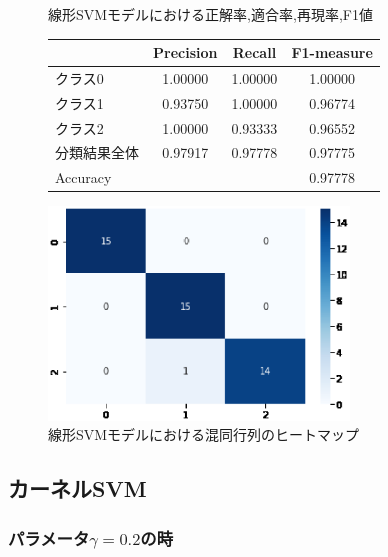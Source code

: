 \documentclass{jarticle}     %
\makeatletter
\newcommand{\tblcaption}[1]{\def\@captype{table}\caption{#1}}
\makeatother
\begin{document}
\begin{figure}[H]
  \def\@captype{table}
  \begin{minipage}[c]{.48\textwidth}
    \tblcaption{線形SVMモデルにおける正解率,適合率,再現率,F1値}
    \label{table:線形SVM}
    \centering
      \begin{tabular}{lccc}
        \hline
        & Precision  &  Recall &  F1-measure \\
        \hline
        クラス0  & 1.00000  & 1.00000 & 1.00000 \\
        クラス1  & 0.93750  & 1.00000 & 0.96774 \\
        クラス2  & 1.00000  & 0.93333 & 0.96552 \\
        分類結果全体  &  0.97917  &  0.97778 & 0.97775 \\
        \hline
        Accuracy & & & 0.97778\\
        \hline
      \end{tabular}
  \end{minipage}
  \hfill
  \begin{minipage}[c]{.48\textwidth}
    \includegraphics[width=80mm]{assets/linear_heatmap.eps}
    \caption{線形SVMモデルにおける混同行列のヒートマップ}
    \label{fig:線形SVM}
  \end{minipage}
\end{figure}



\subsection{カーネルSVM}

\subsubsection{パラメータ$\gamma = 0.2$の時}
\end{document}
